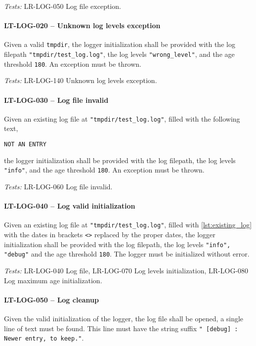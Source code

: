 \textit{Tests: } LR-LOG-050 Log file exception.

\paragraph{LT-LOG-020 -- Unknown log levels exception}
Given a valid \lstinline{tmpdir}, the logger initialization
shall be provided with the log filepath \lstinline{"tmpdir/test_log.log"},
the log levels \lstinline{"wrong_level"}, and the age threshold
\lstinline{180}.
An exception must be thrown.

\textit{Tests: } LR-LOG-140 Unknown log levels exception.

\paragraph{LT-LOG-030 -- Log file invalid}
Given an existing log file at \lstinline{"tmpdir/test_log.log"},
filled with the following text,
\begin{lstlisting}
NOT AN ENTRY
\end{lstlisting}
the logger initialization shall be provided with the log filepath,
the log levels \lstinline{"info"}, and the age threshold \lstinline{180}.
An exception must be thrown.

\textit{Tests: } LR-LOG-060 Log file invalid.

\paragraph{LT-LOG-040 -- Log valid initialization}
Given an existing log file at \lstinline{"tmpdir/test_log.log"},
filled with \cref{lst:existing_log} with the dates in brackets \lstinline{<>}
replaced by the proper dates, the logger initialization shall be
provided with the log filepath, the log levels \lstinline{"info", "debug"}
and the age threshold \lstinline{180}.
The logger must be initialized without error.

\textit{Tests: } LR-LOG-040 Log file, LR-LOG-070 Log levels initialization,
                 LR-LOG-080 Log maximum age initialization.

\paragraph{LT-LOG-050 -- Log cleanup}
Given the valid initialization of the logger, the log file
shall be opened, a single line of text must be found.
This line must have the string suffix
\lstinline{" [debug] : Newer entry, to keep."}.

